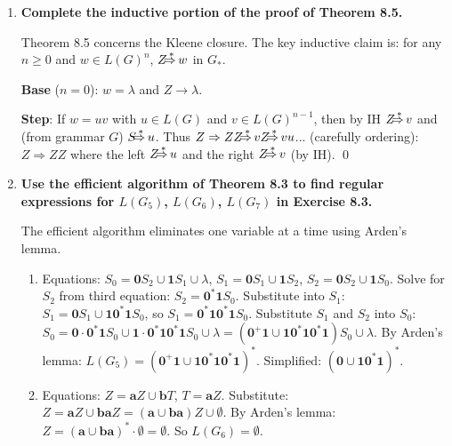 \begin{enumerate}[{8.}1. ]
($\Leftarrow$) If $w = w_1 w_2 \cdots w_k$ with each $w_i \in L(G)$, then $Z \Rightarrow ZZ \Rightarrow ZZZ \Rightarrow \cdots \DRightarrow w_1 w_2 \cdots w_k$ by induction on $k$. \qed

\item \textbf{Complete the inductive portion of the proof of Theorem 8.5.}

Theorem 8.5 concerns the Kleene closure. The key inductive claim is: for any $n \geq 0$ and $w \in L(G)^n$, $Z \DRightarrow w$ in $G_*$.

\textbf{Base} ($n=0$): $w = \lambda$ and $Z \to \lambda$.

\textbf{Step}: If $w = uv$ with $u \in L(G)$ and $v \in L(G)^{n-1}$, then by IH $Z \DRightarrow v$ and (from grammar $G$) $S \DRightarrow u$. Thus $Z \Rightarrow ZZ \DRightarrow vZ \DRightarrow vu$... (carefully ordering): $Z \Rightarrow ZZ$ where the left $Z \DRightarrow u$ and the right $Z \DRightarrow v$ (by IH). \qed

\item \textbf{Use the efficient algorithm of Theorem 8.3 to find regular expressions for $L(G_5)$, $L(G_6)$, $L(G_7)$ in Exercise 8.3.}

The efficient algorithm eliminates one variable at a time using Arden's lemma.

\begin{enumerate}
\item[$G_5$:] Equations: $S_0 = \pmb{0}S_2 \cup \pmb{1}S_1 \cup \lambda$, $S_1 = \pmb{0}S_1 \cup \pmb{1}S_2$, $S_2 = \pmb{0}S_2 \cup \pmb{1}S_0$.
Solve for $S_2$ from third equation: $S_2 = \pmb{0}^*\pmb{1}S_0$.
Substitute into $S_1$: $S_1 = \pmb{0}S_1 \cup \pmb{1}\pmb{0}^*\pmb{1}S_0$, so $S_1 = \pmb{0}^*\pmb{1}\pmb{0}^*\pmb{1}S_0$.
Substitute $S_1$ and $S_2$ into $S_0$: $S_0 = \pmb{0}\cdot\pmb{0}^*\pmb{1}S_0 \cup \pmb{1}\cdot\pmb{0}^*\pmb{1}\pmb{0}^*\pmb{1}S_0 \cup \lambda = (\pmb{0}^+\pmb{1} \cup \pmb{1}\pmb{0}^*\pmb{1}\pmb{0}^*\pmb{1})S_0 \cup \lambda$.
By Arden's lemma: $L(G_5) = (\pmb{0}^+\pmb{1}\cup\pmb{1}\pmb{0}^*\pmb{1}\pmb{0}^*\pmb{1})^*$.
Simplified: $(\pmb{0}\cup\pmb{10}^*\pmb{1})^*$.

\item[$G_6$:] Equations: $Z = \pmb{a}Z \cup \pmb{b}T$, $T = \pmb{a}Z$. Substitute: $Z = \pmb{a}Z \cup \pmb{ba}Z = (\pmb{a}\cup\pmb{ba})Z \cup \emptyset$. By Arden's lemma: $Z = (\pmb{a}\cup\pmb{ba})^*\cdot\emptyset = \emptyset$. So $L(G_6) = \emptyset$.


\end{enumerate}
\end{enumerate}
